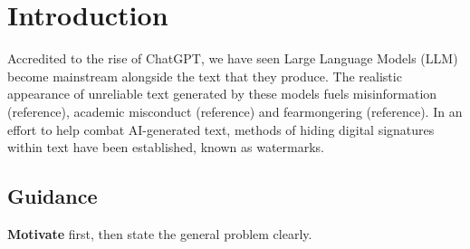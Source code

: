\documentclass{l4proj}
\theoremstyle{definition}
\begin{document}
%
%
%
%
%
%
%
%
\chapter{Introduction}



Accredited to the rise of ChatGPT, we have seen Large Language Models (LLM) become mainstream alongside the text that they produce. The realistic appearance of unreliable text generated by these models fuels misinformation (reference), academic misconduct (reference) and fearmongering (reference). In an effort to help combat AI-generated text, methods of hiding digital signatures within text have been established, known as watermarks. 
\section{Guidance}

\textbf{Motivate} first, then state the general problem clearly. 
\end{document}

